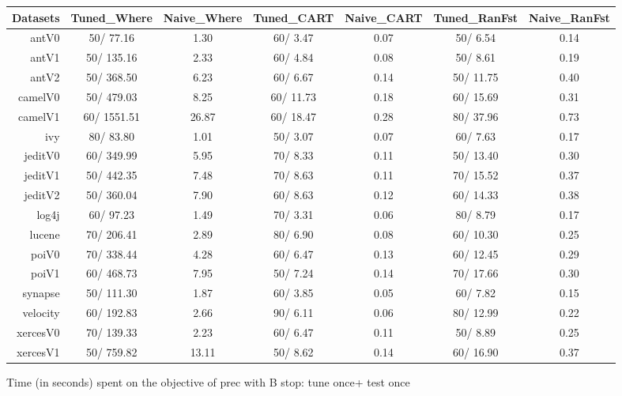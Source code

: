 \documentclass{acm_proc_article-sp}
\begin{document}
\begin{figure*}[!ht]
\scriptsize
\centering
  \begin{tabular}{r|c |c |c |c |c |c }
    \hline\hline
    Datasets & Tuned\_Where & Naive\_Where & Tuned\_CART & Naive\_CART & Tuned\_RanFst & Naive\_RanFst\\
    \hline
    antV0 & 50/ 77.16 & 1.30 & 60/ 3.47 & 0.07 & 50/ 6.54 & 0.14\\
    antV1 & 50/ 135.16 & 2.33 & 60/ 4.84 & 0.08 & 50/ 8.61 & 0.19\\
    antV2 & 50/ 368.50 & 6.23 & 60/ 6.67 & 0.14 & 50/ 11.75 & 0.40\\
    camelV0 & 50/ 479.03 & 8.25 & 60/ 11.73 & 0.18 & 60/ 15.69 & 0.31\\
    camelV1 & 60/ 1551.51 & 26.87 & 60/ 18.47 & 0.28 & 80/ 37.96 & 0.73\\
    ivy & 80/ 83.80 & 1.01 & 50/ 3.07 & 0.07 & 60/ 7.63 & 0.17\\
    jeditV0 & 60/ 349.99 & 5.95 & 70/ 8.33 & 0.11 & 50/ 13.40 & 0.30\\
    jeditV1 & 50/ 442.35 & 7.48 & 70/ 8.63 & 0.11 & 70/ 15.52 & 0.37\\
    jeditV2 & 50/ 360.04 & 7.90 & 60/ 8.63 & 0.12 & 60/ 14.33 & 0.38\\
    log4j & 60/ 97.23 & 1.49 & 70/ 3.31 & 0.06 & 80/ 8.79 & 0.17\\
    lucene & 70/ 206.41 & 2.89 & 80/ 6.90 & 0.08 & 60/ 10.30 & 0.25\\
    poiV0 & 70/ 338.44 & 4.28 & 60/ 6.47 & 0.13 & 60/ 12.45 & 0.29\\
    poiV1 & 60/ 468.73 & 7.95 & 50/ 7.24 & 0.14 & 70/ 17.66 & 0.30\\
    synapse & 50/ 111.30 & 1.87 & 60/ 3.85 & 0.05 & 60/ 7.82 & 0.15\\
    velocity & 60/ 192.83 & 2.66 & 90/ 6.11 & 0.06 & 80/ 12.99 & 0.22\\
    xercesV0 & 70/ 139.33 & 2.23 & 60/ 6.47 & 0.11 & 50/ 8.89 & 0.25\\
    xercesV1 & 50/ 759.82 & 13.11 & 50/ 8.62 & 0.14 & 60/ 16.90 & 0.37\\
  \end{tabular}
  \caption{Time (in seconds) spent on the objective of prec with B stop: tune once+ test once}
\end{figure*}
\end{document}
